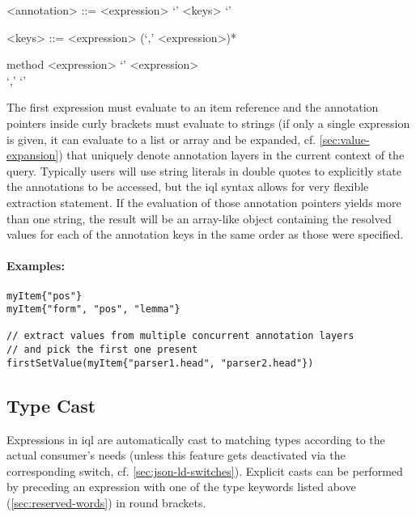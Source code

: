 \documentclass[11pt,a4paper]{report}
\begin{document}
\begin{gram}
	\label{gram:annotation-access}
	\begin{grammar}	
		<annotation> ::= <expression> `{' <keys> `}'
		
		<keys> ::= <expression> (`,' <expression>)*
	\end{grammar}
	\diagsep
	
	\begin{rrdiag*}{method}
		<expression> `{' \srp <expression> \\ `,' \erp `}'
	\end{rrdiag*}
\end{gram}

\noindent The first expression must evaluate to an item reference and the annotation pointers inside curly brackets must evaluate to strings (if only a single expression is given, it can evaluate to a list or array and be expanded, cf. \cref{sec:value-expansion}) that uniquely denote annotation layers in the current context of the query. Typically users will use string literals in double quotes to explicitly state the annotations to be accessed, but the \ac{iql} syntax allows for very flexible extraction statement. If the evaluation of those annotation pointers yields more than one string, the result will be an array-like object containing the resolved values for each of the annotation keys in the same order as those were specified.

\paragraph{Examples:}

\begin{Verbatim}[samepage=true]
myItem{"pos"}
myItem{"form", "pos", "lemma"} 

// extract values from multiple concurrent annotation layers
// and pick the first one present
firstSetValue(myItem{"parser1.head", "parser2.head"})  
\end{Verbatim}

\subsection{Type Cast}
\label{sec:type-cast}

Expressions in \ac{iql} are automatically cast to matching types according to the actual consumer's needs (unless this feature gets deactivated via the corresponding switch, cf. \cref{sec:json-ld-switches}). Explicit casts can be performed by preceding an expression with one of the type keywords listed above (\ref{sec:reserved-words}) in round brackets.
\end{document}
